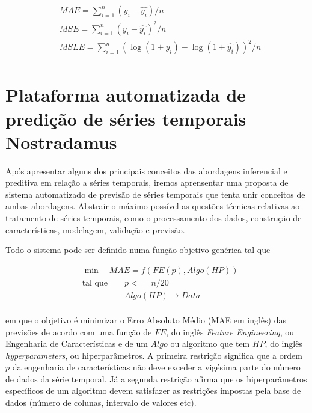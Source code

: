 \documentclass[twocolumn]{rbef}
\newcommand{\1}{\mathbbm{1}}
\begin{document}
\begin{equation} \label{mineq}
    \begin{split}
        & MAE = \sum_{i=1}^{n} (y_{i} - \hat{y_{i}}) / n \\
        & MSE = \sum_{i=1}^{n} (y_{i} - \hat{y_{i}})^2 / n \\
        & MSLE = \sum_{i=1}^{n} (\log(1 + y_{i}) - \log(1 + \hat{y_{i}}))^2 / n \\
    \end{split}
\end{equation}

\section{Plataforma automatizada de predição de séries temporais Nostradamus} \label{nostradamus}

Após apresentar alguns dos principais conceitos das abordagens inferencial e preditiva em relação a séries temporais, iremos aprensentar uma proposta de sistema automatizado de previsão de séries temporais que tenta unir conceitos de ambas abordagens. Abstrair o máximo possível as questões técnicas relativas ao tratamento de séries temporais, como o processamento dos dados, construção de características, modelagem, validação e previsão.

Todo o sistema pode ser definido numa função objetivo genérica tal que

\begin{equation}
    \begin{split}
        & \min \quad MAE = f(FE(p), Algo(HP)) \\
        & \text{tal que} \qquad p <= n / 20 \\
        & \qquad \qquad \quad Algo(HP) \to Data \\
    \end{split}
\end{equation}

em que o objetivo é minimizar o Erro Absoluto Médio (MAE em inglês) das previsões de acordo com uma função de $FE$, do inglês \textit{Feature Engineering}, ou Engenharia de Características e de um $Algo$ ou algoritmo que tem $HP$, do inglês \textit{hyperparameters}, ou hiperparâmetros. A primeira restrição significa que a ordem $p$ da engenharia de características não deve exceder a vigésima parte do número de dados da série temporal. Já a segunda restrição afirma que os hiperparâmetros específicos de um algoritmo devem satisfazer as restrições impostas pela base de dados (número de colunas, intervalo de valores etc).
\end{document}
